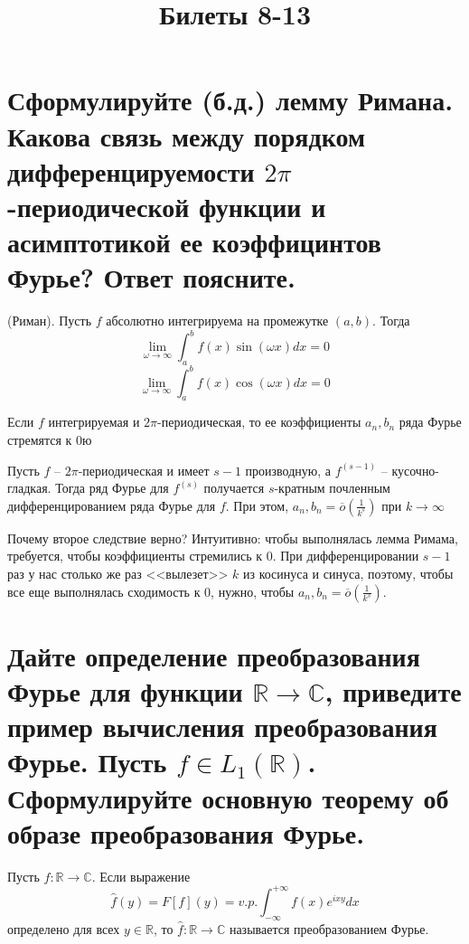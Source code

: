 \usepackage{commath}

\makeatletter
\newcommand*{\toto}[2]{\mathrel{
  \settowidth{\@tempdima}{$\scriptstyle#1$}
  \settowidth{\@tempdimb}{$\scriptstyle#2$}
  \ifdim\@tempdimb>\@tempdima \@tempdima=\@tempdimb\fi
  \mathop{\vcenter{
    \offinterlineskip\ialign{\hbox to\dimexpr\@tempdima+1em{##}\cr
    \rightarrowfill\cr\noalign{\kern.5ex}
    \rightarrowfill\cr}}}\limits^{\!#1}_{\!#2}}}
\makeatother


\title{Билеты 8-13}
\author{}
\date{}

\maketitle

\setcounter{section}{7}
\section{Сформулируйте (б.д.) лемму Римана. Какова связь между порядком дифференцируемости $2\pi$-периодической функции и асимптотикой ее коэффицинтов Фурье? Ответ поясните.}
\begin{lemma} (Риман).
    Пусть $f$ абсолютно интегрируема на промежутке $(a, b)$. Тогда
    $$
        \lim\limits_{\omega\to\infty}\int_{a}^{b}f(x)\sin(\omega x)dx = 0
    $$
    $$
        \lim\limits_{\omega\to\infty}\int_{a}^{b}f(x)\cos(\omega x)dx = 0
    $$
\end{lemma}

\begin{corollary}
    Если $f$ интегрируемая и $2\pi$-периодическая, то ее коэффициенты $a_n, b_n$ ряда Фурье стремятся к 0ю
\end{corollary}

\begin{corollary}
    Пусть $f$ -- $2\pi$-периодическая и имеет $s - 1$ производную, а $f^{(s - 1)}$ -- кусочно-гладкая. Тогда ряд Фурье для $f^{(s)}$ получается $s$-кратным почленным дифференцированием ряда Фурье для $f$. При этом, $a_n, b_n = \overline{o}\left(\frac{1}{k^s}\right)$ при $k\to\infty$
\end{corollary}
Почему второе следствие верно? Интуитивно: чтобы выполнялась лемма Римама, требуется, чтобы коэффициенты стремились к 0. При дифференцировании $s - 1$ раз у нас столько же раз <<вылезет>> $k$ из косинуса и синуса, поэтому, чтобы все еще выполнялась сходимость к 0, нужно, чтобы $a_n, b_n = \overline{o}\left(\frac{1}{k^s}\right)$.

\section{Дайте определение преобразования Фурье для функции $\mathbb{R}\to\mathbb{C}$, приведите пример вычисления преобразования Фурье. Пусть $f\in L_1(\mathbb{R})$. Сформулируйте основную теорему об образе преобразования Фурье.}
\begin{definition}
    Пусть $f\colon\mathbb{R}\to\mathbb{C}$. Если выражение $$\hat{f}(y) = F[f](y) = v.p.\int_{-\infty}^{+\infty}f(x)e^{ixy}dx$$ определено для всех $y\in\mathbb{R}$, то $\hat{f}\colon\mathbb{R}\to\mathbb{C}$ называется преобразованием Фурье.
\end{definition}


